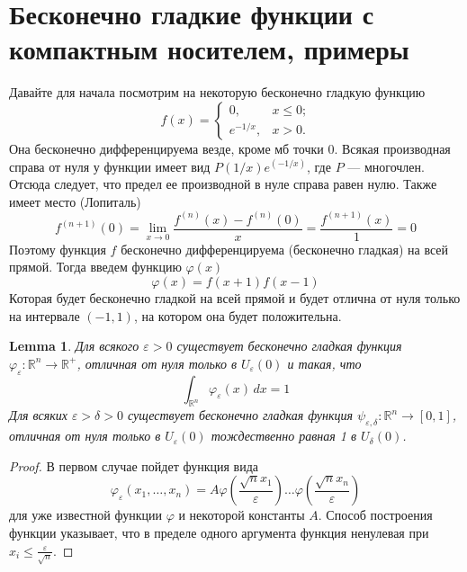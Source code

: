 \documentclass[a4paper,12pt]{article} %
\newtheorem{lemma}[theorem]{Lemma}
\theoremstyle{definition}
\begin{document}
\section{Бесконечно гладкие функции с компактным носителем, примеры}
Давайте для начала посмотрим на некоторую бесконечно гладкую функцию
\begin{equation}
	f(x) = 
	\begin{cases}
		0,  & \text{$x \leq 0$;} \\
		e^{-1/x},  & \text{$x > 0$.}
	\end{cases}
\end{equation}
Она бесконечно дифференцируема везде, кроме мб точки $0$. Всякая производная справа от нуля у функции имеет вид $P(1/x) e^(-1/x)$, где $P$ --- многочлен. Отсюда следует, что предел ее производной в нуле справа равен нулю. Также имеет место (Лопиталь)
\begin{equation}
	f^{(n+1)}(0) = \lim\limits_{x \rightarrow 0} \frac{f^{(n)}(x) - f^{(n)}(0)}{x} = \frac{f^{(n+1)}(x)}{1} = 0
\end{equation}
Поэтому функция $f$ бесконечно дифференцируема (бесконечно гладкая) на всей прямой. Тогда введем функцию $\varphi(x)$
\begin{equation}
	\varphi(x) = f(x + 1)f(x - 1)
\end{equation}
Которая будет бесконечно гладкой на всей прямой и будет отлична от нуля только на интервале $(-1, 1)$, на котором она будет положительна.
\begin{lemma}
	Для всякого $\varepsilon > 0$ существует бесконечно гладкая функция $\varphi_{\varepsilon} : \mathbb{R}^n \rightarrow \mathbb{R}^+$, отличная от нуля только в $U_{\varepsilon}(0)$ и такая, что 
	\begin{equation}
		\int_{\mathbb{R}^n} \varphi_{\varepsilon} (x) \, dx = 1
	\end{equation}
	Для всяких $\varepsilon > \delta > 0$ существует бесконечно гладкая функция $\psi_{\varepsilon, \delta} : \mathbb{R}^n \rightarrow [0, 1]$, отличная от  нуля только в $U_{\varepsilon}(0)$ тождественно равная 1 в $U_{\delta}(0)$.
 \end{lemma}
\begin{proof}
	В первом случае пойдет функция вида
	\begin{equation}
		\varphi_{\varepsilon}(x_1, \dots, x_n) = A \varphi(\frac{\sqrt{n} x_1}{\varepsilon}) \dots  \varphi(\frac{\sqrt{n} x_n}{\varepsilon}) 
	\end{equation}
	для уже известной функции $\varphi$ и некоторой константы $A$. Способ построения функции указывает, что в пределе одного аргумента функция ненулевая при $x_i \leq \frac{\varepsilon}{\sqrt{n}}$.
\end{proof}
\end{document}
